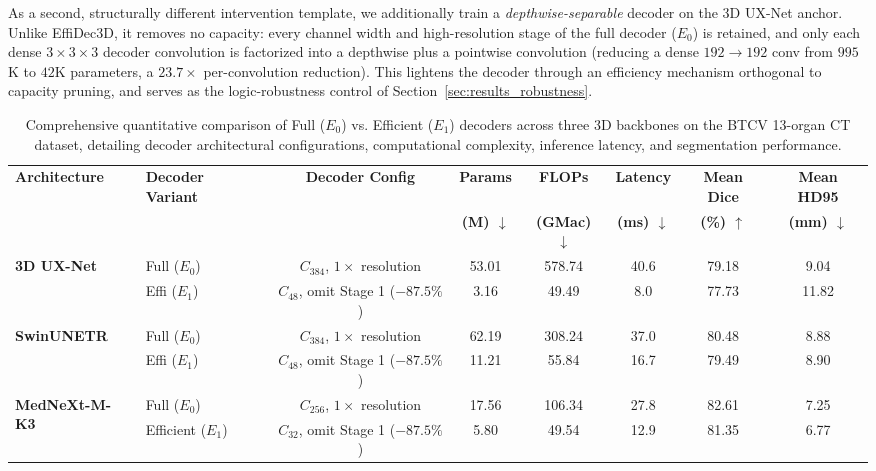 As a second, structurally different intervention template, we additionally train a \emph{depthwise-separable} decoder \cite{chollet2017xception} on the 3D UX-Net anchor. Unlike EffiDec3D, it removes no capacity: every channel width and high-resolution stage of the full decoder ($E_0$) is retained, and only each dense $3\times3\times3$ decoder convolution is factorized into a depthwise plus a pointwise convolution (reducing a dense $192\rightarrow192$ conv from $995$K to $42$K parameters, a $23.7\times$ per-convolution reduction). This lightens the decoder through an efficiency mechanism orthogonal to capacity pruning, and serves as the logic-robustness control of Section~\ref{sec:results_robustness}.

\begin{table}[t]
\centering
\caption{Comprehensive quantitative comparison of Full ($E_0$) vs. Efficient ($E_1$) decoders across three 3D backbones on the BTCV 13-organ CT dataset, detailing decoder architectural configurations, computational complexity, inference latency, and segmentation performance.}
\label{tab:main_results}
\footnotesize
\setlength{\tabcolsep}{6pt}
\begin{tabular*}{\textwidth}{@{\extracolsep{\fill}}llcccccc}
\toprule
\textbf{Architecture} & \textbf{Decoder Variant} & \textbf{Decoder Config} & \textbf{Params} & \textbf{FLOPs} & \textbf{Latency} & \textbf{Mean Dice} & \textbf{Mean HD95} \\
 & & & \textbf{(M) $\downarrow$} & \textbf{(GMac) $\downarrow$} & \textbf{(ms) $\downarrow$} & \textbf{(\%) $\uparrow$} & \textbf{(mm) $\downarrow$} \\
\midrule
\multirow{2}{*}{\textbf{3D UX-Net} \cite{lee20233d}} & Full ($E_0$) & $C_{384}$, $1\times$ resolution & 53.01 & 578.74 & 40.6 & 79.18 & 9.04 \\
 & Effi ($E_1$) & $C_{48}$, omit Stage 1 ($-87.5\%$) & 3.16 & 49.49 & 8.0 & 77.73 & 11.82 \\
\midrule
\multirow{2}{*}{\textbf{SwinUNETR} \cite{hatamizadeh2022swin}} & Full ($E_0$) & $C_{384}$, $1\times$ resolution & 62.19 & 308.24 & 37.0 & 80.48 & 8.88 \\
 & Effi ($E_1$) & $C_{48}$, omit Stage 1 ($-87.5\%$) & 11.21 & 55.84 & 16.7 & 79.49 & 8.90 \\
\midrule
\multirow{2}{*}{\textbf{MedNeXt-M-K3} \cite{roy2023mednext}} & Full ($E_0$) & $C_{256}$, $1\times$ resolution & 17.56 & 106.34 & 27.8 & 82.61 & 7.25 \\
 & Efficient ($E_1$) & $C_{32}$, omit Stage 1 ($-87.5\%$) & 5.80 & 49.54 & 12.9 & 81.35 & 6.77 \\
\bottomrule
\end{tabular*}
\end{table}

